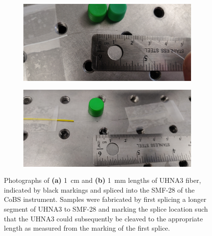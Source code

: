 \begin{figure}[t]
    \centering
    \begin{subfigure}[b]{0.49\textwidth}
        \centering
        \includegraphics[width=\textwidth]{figs/4-Raman/1cm UHNA3.jpeg}
        \caption{}
        \label{fig:Raman:1cmUHNA3pic}
    \end{subfigure}
    \hfill
    \begin{subfigure}[b]{0.49\textwidth}
        \centering
        \includegraphics[width=\textwidth]{figs/4-Raman/1mm UHNA3 in apparatus.jpeg}
        \caption{}
        \label{fig:Raman:1mmUHNA3pic}
    \end{subfigure}
    \caption[Photographs of \SI{1}{\centi\meter} and \SI{1}{\milli\meter} lengths of \ac{UHNA3} fiber.]{Photographs of \textbf{(a)} \SI{1}{\centi\meter} and \textbf{(b)} \SI{1}{\milli\meter} lengths of \ac{UHNA3} fiber, indicated by black markings and spliced into the \ac{SMF-28} of the \ac{CoBS} instrument. Samples were fabricated by first splicing a longer segment of \ac{UHNA3} to \ac{SMF-28} and marking the splice location such that the \ac{UHNA3} could subsequently be cleaved to the appropriate length as measured from the marking of the first splice.}
    \label{fig:Raman:UHNA3pics}
\end{figure}


